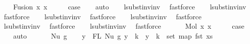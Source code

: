 \begin{isabellebody}
\isamarkupfalse%
\isanewline
\ \ \isamarkupfalse%
\ {\isacharparenleft}{\kern0pt}Fusion\ x{}\ x{}{\isacharparenright}{\kern0pt}\isanewline
\ \ \isamarkupfalse%
\ \isamarkupfalse%
\ {\isacharquery}{\kern0pt}case\isanewline
\ \ \isamarkupfalse%
\ auto\isanewline
\ \ \isamarkupfalse%
\ lsubst{\isacharunderscore}{\kern0pt}inv{\isacharunderscore}{\kern0pt}inv{}\ \isamarkupfalse%
\ fastforce\isanewline
\ \ \isamarkupfalse%
\ lsubst{\isacharunderscore}{\kern0pt}inv{\isacharunderscore}{\kern0pt}inv{}\ \isamarkupfalse%
\ fastforce\isanewline
\ \ \isamarkupfalse%
\ lsubst{\isacharunderscore}{\kern0pt}inv{\isacharunderscore}{\kern0pt}inv{}\ \isamarkupfalse%
\ fastforce\isanewline
\ \ \isamarkupfalse%
\ lsubst{\isacharunderscore}{\kern0pt}inv{\isacharunderscore}{\kern0pt}inv{}\ \isamarkupfalse%
\ fastforce\isanewline
\ \ \isamarkupfalse%
\ lsubst{\isacharunderscore}{\kern0pt}inv{\isacharunderscore}{\kern0pt}inv{}\ \isamarkupfalse%
\ fastforce\isanewline
\ \ \isamarkupfalse%
\ lsubst{\isacharunderscore}{\kern0pt}inv{\isacharunderscore}{\kern0pt}inv{}\ \isamarkupfalse%
\ fastforce\isanewline
\ \ \isamarkupfalse%
\isanewline
{}\isamarkupfalse%
\isanewline
\ \ \isamarkupfalse%
\ {\isacharparenleft}{\kern0pt}Mol\ x{}\ x{}{\isacharparenright}{\kern0pt}\isanewline
\ \ \isamarkupfalse%
\ \isamarkupfalse%
\ {\isacharquery}{\kern0pt}case\isanewline
\ \ \isamarkupfalse%
\ auto\isanewline
\ \ \isamarkupfalse%
\isanewline
{}\isamarkupfalse%
\isanewline
\ \ \isamarkupfalse%
\ {\isacharparenleft}{\kern0pt}Nu\ g{\isacharprime}{\kern0pt}{\isacharparenright}{\kern0pt}\isanewline
\ \ \isamarkupfalse%
\ {\isachardoublequoteopen}{\isasymforall}y\ {\isasymin}\ FL\ {\isacharparenleft}{\kern0pt}Nu\ g{\isacharprime}{\kern0pt}{\isacharparenright}{\kern0pt}{\isachardot}{\kern0pt}\ y\ {\isachargreater}{\kern0pt}{\isacharequal}{\kern0pt}\ k\ {\isacharminus}{\kern0pt}{\isacharminus}{\kern0pt}{\isachargreater}{\kern0pt}\ y\ {\isacharminus}{\kern0pt}\ k\ {\isasymin}\ set\ {\isacharparenleft}{\kern0pt}map\ fst\ xs{\isacharparenright}{\kern0pt}{\isachardoublequoteclose}\isanewline

\end{isabellebody}
